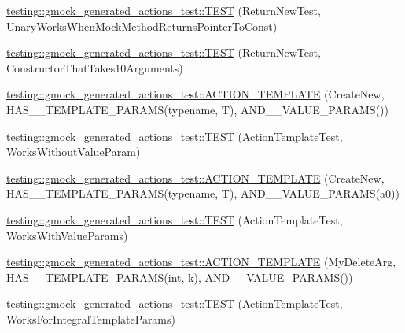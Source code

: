 \begin{DoxyCompactItemize}
\mbox{\hyperlink{namespacetesting_1_1gmock__generated__actions__test_ad9f45ddc4a5616b919116c766ad37a30}{testing\+::gmock\+\_\+generated\+\_\+actions\+\_\+test\+::\+T\+E\+ST}} (Return\+New\+Test, Unary\+Works\+When\+Mock\+Method\+Returns\+Pointer\+To\+Const)
\item 
\mbox{\hyperlink{namespacetesting_1_1gmock__generated__actions__test_a1ed6392f4aeb68b9429ff7dd98ce5a86}{testing\+::gmock\+\_\+generated\+\_\+actions\+\_\+test\+::\+T\+E\+ST}} (Return\+New\+Test, Constructor\+That\+Takes10\+Arguments)
\item 
\mbox{\hyperlink{namespacetesting_1_1gmock__generated__actions__test_a1debc0726715951fcd7f5443e436dc46}{testing\+::gmock\+\_\+generated\+\_\+actions\+\_\+test\+::\+A\+C\+T\+I\+O\+N\+\_\+\+T\+E\+M\+P\+L\+A\+TE}} (Create\+New, H\+A\+S\+\_\+\_\+\+T\+E\+M\+P\+L\+A\+T\+E\+\_\+\+P\+A\+R\+A\+MS(typename, T), A\+N\+D\+\_\+\_\+\+V\+A\+L\+U\+E\+\_\+\+P\+A\+R\+A\+MS())
\item 
\mbox{\hyperlink{namespacetesting_1_1gmock__generated__actions__test_aaac879cbe00638dcc2d4733760180a4f}{testing\+::gmock\+\_\+generated\+\_\+actions\+\_\+test\+::\+T\+E\+ST}} (Action\+Template\+Test, Works\+Without\+Value\+Param)
\item 
\mbox{\hyperlink{namespacetesting_1_1gmock__generated__actions__test_a38fb8047f95126bb0b2cfe7e670c8af7}{testing\+::gmock\+\_\+generated\+\_\+actions\+\_\+test\+::\+A\+C\+T\+I\+O\+N\+\_\+\+T\+E\+M\+P\+L\+A\+TE}} (Create\+New, H\+A\+S\+\_\+\_\+\+T\+E\+M\+P\+L\+A\+T\+E\+\_\+\+P\+A\+R\+A\+MS(typename, T), A\+N\+D\+\_\+\_\+\+V\+A\+L\+U\+E\+\_\+\+P\+A\+R\+A\+MS(a0))
\item 
\mbox{\hyperlink{namespacetesting_1_1gmock__generated__actions__test_a21f6e2ad5c4c1afecca93a42c9a84f1a}{testing\+::gmock\+\_\+generated\+\_\+actions\+\_\+test\+::\+T\+E\+ST}} (Action\+Template\+Test, Works\+With\+Value\+Params)
\item 
\mbox{\hyperlink{namespacetesting_1_1gmock__generated__actions__test_aaaac0fbf0bf2c7bd8fc104310e6af25c}{testing\+::gmock\+\_\+generated\+\_\+actions\+\_\+test\+::\+A\+C\+T\+I\+O\+N\+\_\+\+T\+E\+M\+P\+L\+A\+TE}} (My\+Delete\+Arg, H\+A\+S\+\_\+\_\+\+T\+E\+M\+P\+L\+A\+T\+E\+\_\+\+P\+A\+R\+A\+MS(int, k), A\+N\+D\+\_\+\_\+\+V\+A\+L\+U\+E\+\_\+\+P\+A\+R\+A\+MS())
\item 
\mbox{\hyperlink{namespacetesting_1_1gmock__generated__actions__test_aad8d77a35ac21f366dc334a45cf5b140}{testing\+::gmock\+\_\+generated\+\_\+actions\+\_\+test\+::\+T\+E\+ST}} (Action\+Template\+Test, Works\+For\+Integral\+Template\+Params)

\end{DoxyCompactItemize}
